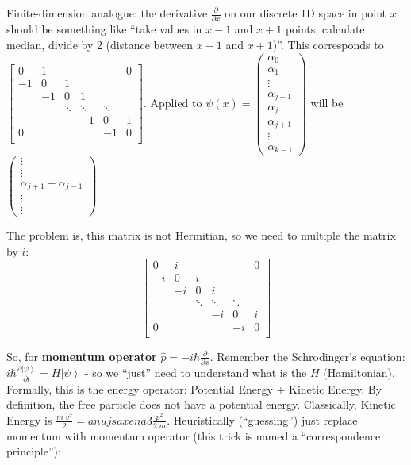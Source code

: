 \documentclass{scrartcl}
\newcommand{\ket}[1]{\left| #1 \right>} %
\begin{document}
Finite-dimension analogue: the derivative $\frac \partial {\partial x}$ on our
discrete 1D space in point $x$ should be something like ``take values in $x-1$
and $x+1$ points, calculate median, divide by 2 (distance between $x-1$ and
$x+1$)''. This corresponds to $\left[ \begin{array}{cccccc}
    0& 1&  &  & & 0 \\
    -1& 0& 1&  & & \\
    &-1& 0& 1& & \\
    &  & \ddots & \ddots & \ddots \\
    & & &-1 & 0 &1 \\
    0 & & & & -1 &0 \\
  \end{array}\right]$. Applied to $\psi(x) = \begin{pmatrix} \alpha_0 \\ \alpha_1 \\ \vdots \\
  \alpha_{j-1} \\ \alpha_j \\ \alpha_{j+1} \\ \vdots \\
  \alpha_{k-1} \end{pmatrix}$ will be
$\begin{pmatrix} \vdots \\ \vdots \\ \alpha_{j+1} - \alpha_{j-1} \\ \vdots \\
  \vdots \end{pmatrix}$

The problem is, this matrix is not Hermitian, so we need to multiple the matrix
by $i$:
$$\left[ \begin{array}{cccccc}
    0& i&  &  & & 0 \\
    -i& 0& i&  & & \\
    &-i& 0& i& & \\
    &  & \ddots & \ddots & \ddots \\
    & & &-i & 0 &i \\
    0 & & & & -i &0 \\
  \end{array}\right]$$

So, for {\bf momentum operator} $\hat p = -i\hbar \frac \partial {\partial x}$.
Remember the Schrodinger's equation: $i \hbar \frac{\partial \ket\psi}{\partial
  t} = H \ket\psi$ - so we ``just'' need to understand what is the $H$
(Hamiltonian). Formally, this is the energy operator: Potential Energy + Kinetic
Energy. By definition, the free particle does not have a potential energy.
Classically, Kinetic Energy is $\frac{m\;v^2}2 =anujsaxena3 \frac{p^2}{2 \; m}$.
Heuristically (``guessing'') just replace momentum with momentum operator (this
trick is named a ``correspondence principle''):
\end{document}
